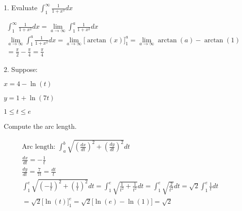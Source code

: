     \begin{itemize}
        \item [1.] Evaluate $\int_{1}^{\infty} \frac{1}{1+x^{2}}dx$
        \\
        \begin{mdframed}
            \begin{equation*}
                \begin{gathered}
                    \int_{1}^{\infty} \frac{1}{1+x^{2}}dx =
                    \lim_{a \to \infty} \int_{1}^{a} \frac{1}{1+x^{2}}dx    \\
                    \lim_{a \to \infty} \int_{1}^{a} \frac{1}{1+x^{2}}dx =
                    \lim_{a \to \infty} \Big[\arctan(x)\Big]_{1}^{a} =
                    \lim_{a \to \infty} \arctan(a) - \arctan(1)             \\
                    = \frac{\pi}{2} - \frac{\pi}{4} = \boxed{\frac{\pi}{4}}
                \end{gathered}
            \end{equation*}
        \end{mdframed}
        
        \item [2.] Suppose:
        
        $x=4-\ln(t)$

        $y=1+\ln(7t)$

        $1 \leq t \leq e$

        Compute the arc length.
        \\
        \begin{mdframed}
            \begin{equation*}
                \begin{gathered}
                    \text{Arc length: } \int_{a}^{b}\sqrt{\left(\frac{dx}{dt}\right)^{2} + \left(\frac{dy}{dt}\right)^{2}}dt    \\
                    \frac{dx}{dt} = -\frac{1}{t}                \\
                    \frac{dy}{dt} = \frac{7}{7t} = \frac{dt}{t} \\
                    \int_{1}^{e}\sqrt{\left(-\frac{1}{t}\right)^{2} + \left(\frac{1}{t}\right)^{2}}dt =
                    \int_{1}^{e}\sqrt{\frac{1}{t^{2}} + \frac{1}{t^{2}}}dt =
                    \int_{1}^{e}\sqrt{\frac{2}{t^{2}}}dt =
                    \sqrt{2}\int_{1}^{e}\frac{1}{t}dt           \\
                    = \sqrt{2}\Big[\ln(t)\Big]_{1}^{e} =
                    \sqrt{2}\Big[\ln(e) - \ln(1)\Big] =
                    \boxed{\sqrt{2}}
                \end{gathered}
            \end{equation*}
        \end{mdframed}


\end{itemize}
